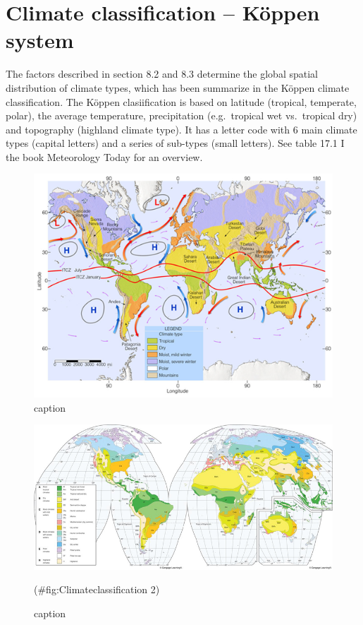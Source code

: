 \documentclass[12pt,oneside]{book}
\begin{document}
\section{Climate classification -- Köppen
system}\label{climate-classification-kuxf6ppen-system}

The factors described in section 8.2 and 8.3 determine the global
spatial distribution of climate types, which has been summarize in the
Köppen climate classification. The Köppen clasiification is based on
latitude (tropical, temperate, polar), the average temperature,
precipitation (e.g.~tropical wet vs.~tropical dry) and topography
(highland climate type). It has a letter code with 6 main climate types
(capital letters) and a series of sub-types (small letters). See table
17.1 I the book Meteorology Today for an overview.

\begin{figure}

{\centering \includegraphics[width=0.8\linewidth]{figures/Figure84} 

}

\caption{caption}\label{fig:Climateclassification}
\end{figure}

\begin{figure}

{\centering \includegraphics[width=0.8\linewidth]{figures/Figure85} 

}

\caption{caption}(\#fig:Climateclassification 2)
\end{figure}
\end{document}
